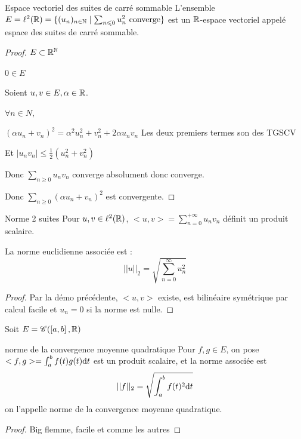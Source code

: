 \begin{theoreme}{Espace vectoriel des suites de carré sommable}{}
    L'ensemble $E = \ell^2(\mathbb{R}) = \{(u_n)_{n \in \mathbb{N}} \mid \sum_{n \leqslant 0 }u_n^2 \text{ converge}\}$
    est un $\mathbb{R}$-espace vectoriel appelé espace des suites de carré sommable. 
\end{theoreme}


\begin{proof}
    $E \subset \mathbb{R}^{\mathbb{N}}$

    $0 \in E$

    Soient $u, v \in E, \alpha \in \mathbb{R}$. 

    $\forall n \in N,$

    $(\alpha u_n + v_n)^2 = \alpha^2u_n^2 + v_n^2 + 2 \alpha u_n v_n$ Les deux premiers termes son des TGSCV

    Et $\mid u_n v_n \mid \leqslant \frac 1 2 (u_n^2 + v_n^2)$

    Donc $\sum_{n \geqslant 0} u_n v_n$ converge absolument donc converge. 

    Donc $\sum_{n \geqslant 0} (\alpha u_n + v_n)^2$ est convergente. 
\end{proof}

\begin{theoreme}{Norme 2 suites}{}
    Pour $u, v \in \ell^2(\mathbb{R})$, $\displaystyle <u, v> = \sum_{n = 0 }^{+ \infty} u_n v_n$
    définit un produit scalaire. 

    La norme euclidienne associée est : 
    $$||u||_2 = \sqrt{\sum_{n = 0 }^{\infty}u_n^2}$$
\end{theoreme}

\begin{proof}
    Par la démo précédente, $<u, v>$ existe, est bilinéaire symétrique par calcul 
    facile et $u_n = 0$ si la norme est nulle. 
\end{proof}

Soit $E = \mathscr C(\left[a, b\right], \mathbb{R})$

\begin{theoreme}{norme de la convergence moyenne quadratique}{}
    Pour $f, g \in E$, on pose 
    $<f, g> = \int_{a}^{b} f(t)g(t) \text d t$
    est un produit scalaire, et la norme associée est 
    $$||f||_2 = \sqrt{\int_{a }^{b } f(t)^2 \text d t}$$
    on l'appelle norme de la convergence moyenne quadratique. 
\end{theoreme}

\begin{proof}
    Big flemme, facile et comme les autres
\end{proof}

